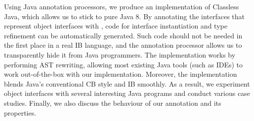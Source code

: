 





Using Java annotation processors, we produce an implementation of
Classless Java, which allows us to stick to pure Java 8. By annotating
 the interfaces that represent object interfaces with \mixin, code for interface instantiation and
type refinement can be automatically generated. Such code should not be needed in the first place in
a real IB language, and the annotation processor allows us to
transparently hide it from Java programmers. The implementation works
by performing AST rewriting, allowing most existing Java tools (such as
IDEs) to work out-of-the-box with our implementation. Moreover, the
implementation blends Java's conventional CB style and IB smoothly.
As a result, we experiment object interfaces with several interesting
Java programs and conduct various case studies.  Finally, we also
discuss the behaviour of our \mixin annotation and 
its properties.



%



